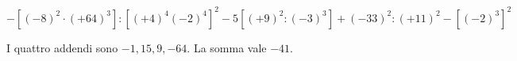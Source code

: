 
\begin{esercizio}
\[
    -[(-8)^2\cdot(+64)^3]:[(+4)^4(-2)^4]^2
    -5[(+9)^2:(-3)^3]
    +(-33)^2:(+11)^2
    -[(-2)^3]^2
    \]
\end{esercizio}

\begin{soluzione}
I quattro addendi sono $-1,15,9,-64$. La somma vale $-41$.
\end{soluzione}

